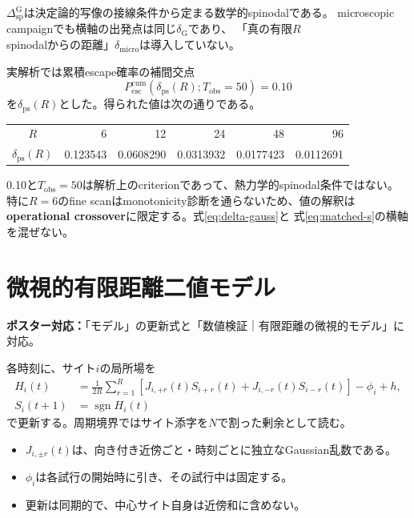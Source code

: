 \documentclass[a4paper,12pt]{ltjsarticle}
\newcommand{\PosterMap}[1]{%
  \begin{tcolorbox}[enhanced,boxrule=0pt,arc=1mm,colback=softgray,
    left=2mm,right=2mm,top=1mm,bottom=1mm,before skip=0pt,after skip=0.7em]
  \normalsize\textbf{ポスター対応：}#1
  \end{tcolorbox}}
\newcommand{\sgn}{\operatorname{sgn}}
\newcommand{\Gauss}{\mathrm G}
\newcommand{\micro}{\mathrm{micro}}
\begin{document}
$\Delta_{\mathrm{sp}}^{\Gauss}$は決定論的写像の接線条件から定まる数学的spinodalである。
microscopic campaignでも横軸の出発点は同じ$\delta_{\Gauss}$であり、
「真の有限$R$ spinodalからの距離」$\delta_{\micro}$は導入していない。

実解析では累積escape確率の補間交点
\begin{equation}
 \boxed{P_{\mathrm{esc}}^{\mathrm{cum}}
   (\delta_{\mathrm{ps}}(R);T_{\mathrm{obs}}=50)=0.10}
 \label{eq:pseudospinodal-criterion}
\end{equation}
を$\delta_{\mathrm{ps}}(R)$とした。得られた値は次の通りである。
\begin{center}\small
\begin{tabular}{c*{5}{r}}
\toprule
$R$ & 6 & 12 & 24 & 48 & 96 \\
$\delta_{\mathrm{ps}}(R)$ & 0.123543 & 0.0608290 & 0.0313932 & 0.0177423 & 0.0112691 \\
\bottomrule
\end{tabular}
\end{center}
0.10と$T_{\mathrm{obs}}=50$は解析上のcriterionであって、熱力学的spinodal条件ではない。
特に$R=6$のfine scanはmonotonicity診断を通らないため、値の解釈は
\textbf{operational crossover}に限定する。式\eqref{eq:delta-gauss}と
式\eqref{eq:matched-s}の横軸を混ぜない。

\section{微視的有限距離二値モデル}\label{sec:microscopic}
\PosterMap{「モデル」の更新式と「数値検証｜有限距離の微視的モデル」に対応。}

各時刻に、サイト$i$の局所場を
\begin{align}
 H_i(t)
 &=\frac{1}{2R}\sum_{r=1}^{R}
 \left[J_{i,+r}(t)S_{i+r}(t)+J_{i,-r}(t)S_{i-r}(t)\right]
 -\phi_i+h,\label{eq:micro-field}\\
 S_i(t+1)&=\sgn H_i(t)\label{eq:micro-update}
\end{align}
で更新する。周期境界ではサイト添字を$N$で割った剰余として読む。

\begin{itemize}
  \item $J_{i,\pm r}(t)$は、向き付き近傍ごと・時刻ごとに独立なGaussian乱数である。
  \item $\phi_i$は各試行の開始時に引き、その試行中は固定する。
  \item 更新は同期的で、中心サイト自身は近傍和に含めない。
\end{itemize}
\end{document}
